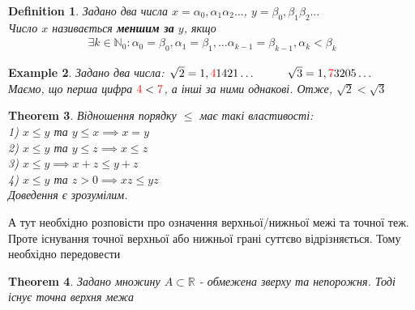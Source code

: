 \documentclass[a4paper, 14pt]{article}
\theoremstyle{theoremdd}
\newtheorem{theorem}{Theorem}[subsection]
\theoremstyle{theoremdd}
\newtheorem{definition}[theorem]{Definition}
\theoremstyle{theoremdd}
\theoremstyle{theoremdd}
\newtheorem{example}[theorem]{Example}
\theoremstyle{theoremdd}
\theoremstyle{theoremdd}
\theoremstyle{theoremdd}
\theoremstyle{theoremdd}
\begin{document}
\begin{definition}
Задано два числа $x = \alpha_0,\alpha_1\alpha_2\dots$, $y = \beta_0,\beta_1\beta_2\dots$\\
Число $x$ називається \textbf{меншим за} $y$, якщо
\begin{align*}
\exists k \in \mathbb{N}_0: \alpha_0 = \beta_0, \alpha_1 = \beta_1, \dots \alpha_{k-1} = \beta_{k-1}, \alpha_k < \beta_k
\end{align*}
\end{definition}

\begin{example}
Задано два числа: $\sqrt{2} = 1,\textcolor{red}{4}1421\dots \hspace{1cm} \sqrt{3} = 1,\textcolor{red}{7}3205\dots \hspace{1cm}$ \\ Маємо, що перша цифра $\textcolor{red}{4} < \textcolor{red}{7}$, а інші за ними однакові. Отже, $\sqrt{2} < \sqrt{3}$
\end{example}

\begin{theorem}
Відношення порядку $\leq$ має такі властивості:\\
1) $x \leq y$ та $y \leq x \implies x = y$\\
2) $x \leq y$ та $y \leq z \implies x \leq z$\\
3) $x \leq y \implies x+z \leq y+z$\\
4) $x \leq y$ та $z >0 \implies xz \leq yz$\\
\textit{Доведення є зрозумілим.}
\end{theorem}

А тут необхідно розповісти про означення верхньої/нижньої межі та точної теж. Проте існування точної верхньої або нижньої грані суттєво відрізняється. Тому необхідно передовести

\begin{theorem}
Задано множину $A \subset \mathbb{R}$ - обмежена зверху та непорожня. Тоді існує точна верхня межа
\end{theorem}
\end{document}
